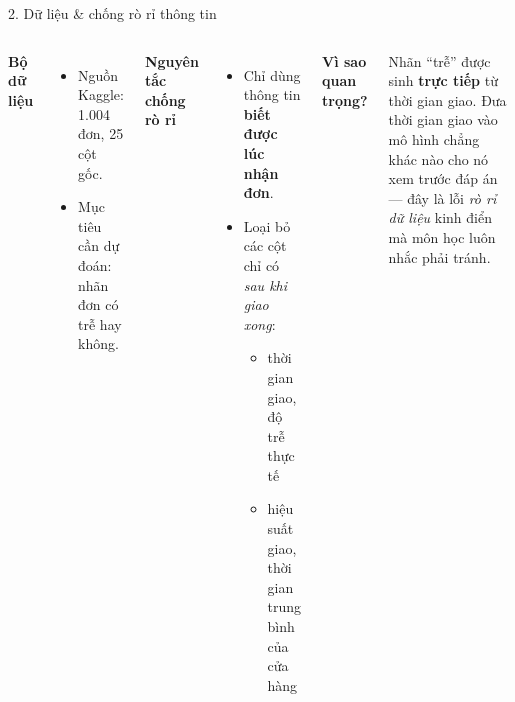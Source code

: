 \documentclass[t, aspectratio=169, 11pt]{beamer}
\newcommand{\blk}[1]{\textbf{\color{hustprimary}#1}}
\begin{document}
\begin{frame}{2. Dữ liệu \& chống rò rỉ thông tin}
    \begin{columns}[T]
        \blk{Bộ dữ liệu}
        \begin{itemize}
            \item Nguồn Kaggle: 1.004 đơn, 25 cột gốc.
            \item Mục tiêu cần dự đoán: nhãn đơn có trễ hay không.
        \end{itemize}
        \vspace{0.12cm}
        \blk{Nguyên tắc chống rò rỉ}
        \begin{itemize}
            \item Chỉ dùng thông tin \textbf{biết được lúc nhận đơn}.
            \item Loại bỏ các cột chỉ có \textit{sau khi giao xong}:
            \begin{itemize}\footnotesize
                \item thời gian giao, độ trễ thực tế
                \item hiệu suất giao, thời gian trung bình của cửa hàng
            \end{itemize}
        \end{itemize}

        \centering
        \blk{Vì sao quan trọng?}\par\vspace{4pt}
        \footnotesize
        Nhãn ``trễ'' được sinh \textbf{trực tiếp} từ thời gian giao. Đưa thời gian
        giao vào mô hình chẳng khác nào cho nó xem trước đáp án — đây là lỗi
        \emph{rò rỉ dữ liệu} kinh điển mà môn học luôn nhắc phải tránh.
    \end{columns}
\end{frame}
\end{document}
